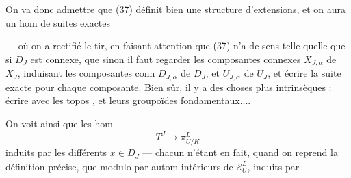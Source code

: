 
On va donc admettre que (37) définit bien une structure d'extensions, et on aura un hom de suites exactes


--- où on a rectifié le tir, en faisant attention que (37) n'a de sens telle quelle que si $D_J$ est connexe,  que sinon il faut regarder les composantes connexes $X_{J,\alpha}$ de $X_J$, induisant les composantes conn $D_{J,\alpha}$ de $D_J$, et $U_{J,\alpha}$ de $U_J$, et écrire la suite exacte pour chaque composante. Bien sûr, il y a des choses plus intrinsèques : écrire avec les topos , et leurs groupoïdes fondamentaux....

On voit ainsi que les hom
\[
\tag{39}
T^J\longrightarrow\pi_{U/K}^{\bar L}
\]
induits par les différents $x\in D_J$ --- chacun n'étant en fait, quand on reprend la définition précise, que  modulo   par autom intérieurs de $\mathcal E_U^{\bar L}$, induits par

